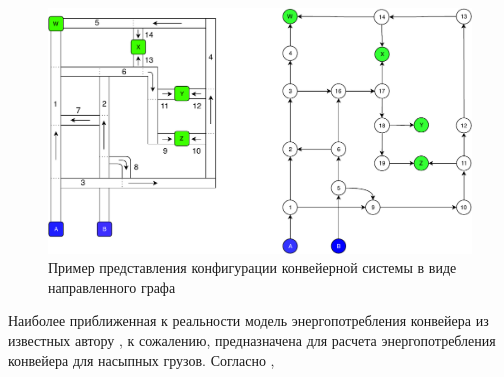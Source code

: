 \documentclass[specification,annotation,times]{itmo-student-thesis}
\theoremstyle{definition}
\begin{document}
\begin{figure}[!h]
  \caption{Пример представления конфигурации конвейерной системы в виде
    направленного графа}\label{conveyor-graph-representation}
  \centering
  \includegraphics[width=\textwidth]{conveyor-1-illustration-2}
\end{figure}

Наиболее приближенная к реальности модель энергопотребления конвейера из
известных автору \cite{zhang2011modeling}, к сожалению, предназначена для расчета энергопотребления
конвейера для насыпных грузов.
Согласно , 
\end{document}
